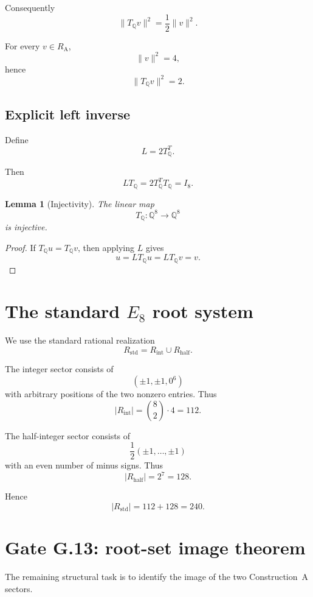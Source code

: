 \documentclass[11pt,a4paper]{article}
\newtheorem{lemma}[theorem]{Lemma}
\theoremstyle{definition}
\theoremstyle{remark}
\newcommand{\Q}{\mathbb Q}
\newcommand{\RA}{R_{\mathrm A}}
\newcommand{\Rstd}{R_{\mathrm{std}}}
\newcommand{\TQ}{T_{\mathbb Q}}
\begin{document}
	Consequently
	\[
	\|\TQ v\|^2
	=
	\frac12\|v\|^2.
	\]
	
	For every $v\in\RA$,
	\[
	\|v\|^2=4,
	\]
	hence
	\[
	\|\TQ v\|^2=2.
	\]
	
	\subsection{Explicit left inverse}
	
	Define
	\[
	L=2\TQ^T.
	\]
	
	Then
	\[
	L\TQ
	=
	2\TQ^T\TQ
	=
	I_8.
	\]
	
	\begin{lemma}[Injectivity]
		The linear map
		\[
		\TQ:\Q^8\to\Q^8
		\]
		is injective.
	\end{lemma}
	
	\begin{proof}
		If $\TQ u=\TQ v$, then applying $L$ gives
		\[
		u
		=
		L\TQ u
		=
		L\TQ v
		=
		v.
		\]
	\end{proof}
	
	\section{The standard $E_8$ root system}
	
	We use the standard rational realization
	\[
	\Rstd
	=
	R_{\mathrm{int}}
	\cup
	R_{\mathrm{half}}.
	\]
	
	The integer sector consists of
	\[
	(\pm1,\pm1,0^6)
	\]
	with arbitrary positions of the two nonzero entries.  Thus
	\[
	|R_{\mathrm{int}}|
	=
	\binom82\cdot4
	=
	112.
	\]
	
	The half-integer sector consists of
	\[
	\frac12(\pm1,\ldots,\pm1)
	\]
	with an even number of minus signs.  Thus
	\[
	|R_{\mathrm{half}}|
	=
	2^7
	=
	128.
	\]
	
	Hence
	\[
	\boxed{
		|\Rstd|=112+128=240.
	}
	\]
	
	\section{Gate G.13: root-set image theorem}
	
	The remaining structural task is to identify the image of the two
	Construction~A sectors.
	
\end{document}
